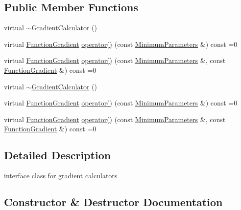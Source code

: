 \subsection*{Public Member Functions}
\begin{DoxyCompactItemize}
\item 
virtual \mbox{\hyperlink{classROOT_1_1Minuit2_1_1GradientCalculator_a918bf4a9fb5ba9ece77d987b44ba33b0}{$\sim$\+Gradient\+Calculator}} ()
\item 
virtual \mbox{\hyperlink{classROOT_1_1Minuit2_1_1FunctionGradient}{Function\+Gradient}} \mbox{\hyperlink{classROOT_1_1Minuit2_1_1GradientCalculator_a1bae913e96ffc9ece28664a5f6f79cb0}{operator()}} (const \mbox{\hyperlink{classROOT_1_1Minuit2_1_1MinimumParameters}{Minimum\+Parameters}} \&) const =0
\item 
virtual \mbox{\hyperlink{classROOT_1_1Minuit2_1_1FunctionGradient}{Function\+Gradient}} \mbox{\hyperlink{classROOT_1_1Minuit2_1_1GradientCalculator_a1809c1e8a89d32aabf7835e9690c2916}{operator()}} (const \mbox{\hyperlink{classROOT_1_1Minuit2_1_1MinimumParameters}{Minimum\+Parameters}} \&, const \mbox{\hyperlink{classROOT_1_1Minuit2_1_1FunctionGradient}{Function\+Gradient}} \&) const =0
\item 
virtual \mbox{\hyperlink{classROOT_1_1Minuit2_1_1GradientCalculator_a918bf4a9fb5ba9ece77d987b44ba33b0}{$\sim$\+Gradient\+Calculator}} ()
\item 
virtual \mbox{\hyperlink{classROOT_1_1Minuit2_1_1FunctionGradient}{Function\+Gradient}} \mbox{\hyperlink{classROOT_1_1Minuit2_1_1GradientCalculator_a1bae913e96ffc9ece28664a5f6f79cb0}{operator()}} (const \mbox{\hyperlink{classROOT_1_1Minuit2_1_1MinimumParameters}{Minimum\+Parameters}} \&) const =0
\item 
virtual \mbox{\hyperlink{classROOT_1_1Minuit2_1_1FunctionGradient}{Function\+Gradient}} \mbox{\hyperlink{classROOT_1_1Minuit2_1_1GradientCalculator_a1809c1e8a89d32aabf7835e9690c2916}{operator()}} (const \mbox{\hyperlink{classROOT_1_1Minuit2_1_1MinimumParameters}{Minimum\+Parameters}} \&, const \mbox{\hyperlink{classROOT_1_1Minuit2_1_1FunctionGradient}{Function\+Gradient}} \&) const =0
\end{DoxyCompactItemize}


\subsection{Detailed Description}
interface class for gradient calculators 

\subsection{Constructor \& Destructor Documentation}
\mbox{\label{classROOT_1_1Minuit2_1_1GradientCalculator_a918bf4a9fb5ba9ece77d987b44ba33b0}} 
